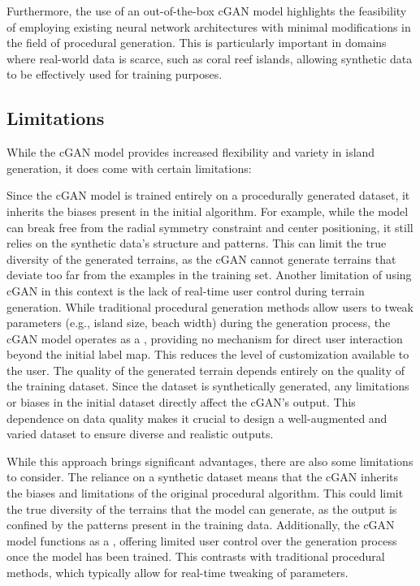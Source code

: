 Furthermore, the use of an out-of-the-box cGAN model highlights the feasibility of employing existing neural network architectures with minimal modifications in the field of procedural generation. This is particularly important in domains where real-world data is scarce, such as coral reef islands, allowing synthetic data to be effectively used for training purposes.


\subsection{Limitations}
\label{sec:coral-island_limitations}

While the cGAN model provides increased flexibility and variety in island generation, it does come with certain limitations:

\begin{Itemize}
     Since the cGAN model is trained entirely on a procedurally generated dataset, it inherits the biases present in the initial algorithm. For example, while the model can break free from the radial symmetry constraint and center positioning, it still relies on the synthetic data's structure and patterns. This can limit the true diversity of the generated terrains, as the cGAN cannot generate terrains that deviate too far from the examples in the training set.
     Another limitation of using cGAN in this context is the lack of real-time user control during terrain generation. While traditional procedural generation methods allow users to tweak parameters (e.g., island size, beach width) during the generation process, the cGAN model operates as a , providing no mechanism for direct user interaction beyond the initial label map. This reduces the level of customization available to the user. 
     The quality of the generated terrain depends entirely on the quality of the training dataset. Since the dataset is synthetically generated, any limitations or biases in the initial dataset directly affect the cGAN's output. This dependence on data quality makes it crucial to design a well-augmented and varied dataset to ensure diverse and realistic outputs.
\end{Itemize}

While this approach brings significant advantages, there are also some limitations to consider. The reliance on a synthetic dataset means that the cGAN inherits the biases and limitations of the original procedural algorithm. This could limit the true diversity of the terrains that the model can generate, as the output is confined by the patterns present in the training data. Additionally, the cGAN model functions as a , offering limited user control over the generation process once the model has been trained. This contrasts with traditional procedural methods, which typically allow for real-time tweaking of parameters.



